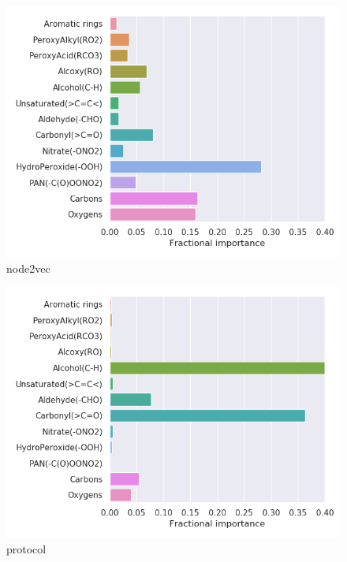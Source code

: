 \begin{subfigure}[b]{0.46\textwidth}
    \centering
    \includegraphics[width=\textwidth]{outputs/AE/node2vec/legend.png}
    \caption{node2vec}
    \label{fig:legend_AE_node2vec}
\end{subfigure}
\begin{subfigure}[b]{0.46\textwidth}
    \centering
    \includegraphics[width=\textwidth]{outputs/AE/protocol/legend.png}
    \caption{protocol}
    \label{fig:legend_AE_protocol}
\end{subfigure}\\
